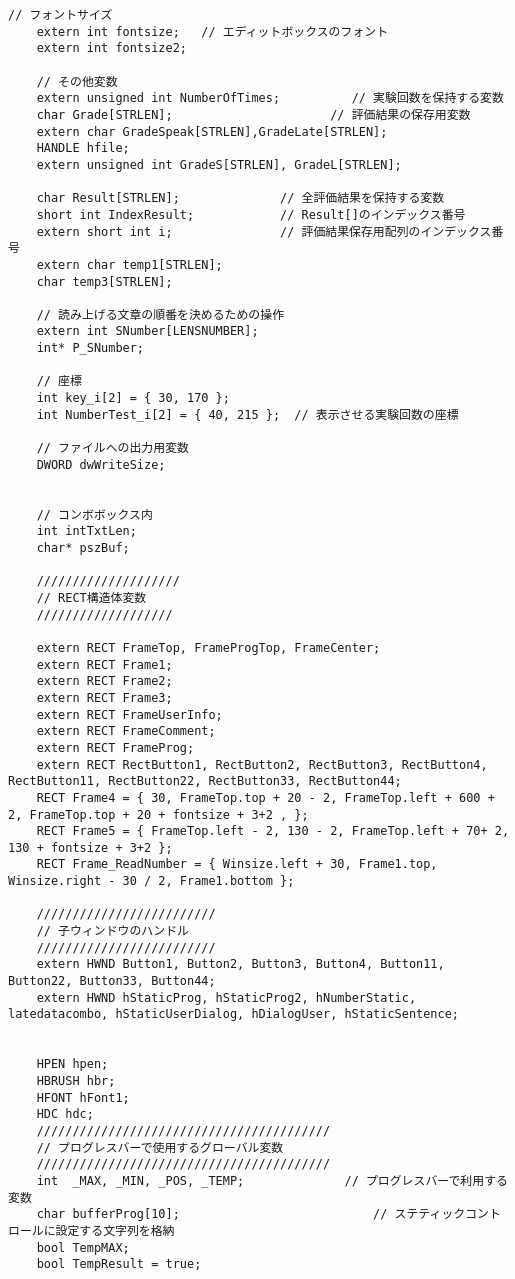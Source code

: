 \begin{lstlisting}[caption=main.cpp]
	// フォントサイズ
	extern int fontsize;   // エディットボックスのフォント
	extern int fontsize2;
	
	// その他変数
	extern unsigned int NumberOfTimes;          // 実験回数を保持する変数
	char Grade[STRLEN];                      // 評価結果の保存用変数
	extern char GradeSpeak[STRLEN],GradeLate[STRLEN];
	HANDLE hfile;
	extern unsigned int GradeS[STRLEN], GradeL[STRLEN];
	
	char Result[STRLEN];              // 全評価結果を保持する変数
	short int IndexResult;            // Result[]のインデックス番号 
	extern short int i;               // 評価結果保存用配列のインデックス番号
	extern char temp1[STRLEN];
	char temp3[STRLEN];
	
	// 読み上げる文章の順番を決めるための操作
	extern int SNumber[LENSNUMBER];
	int* P_SNumber;
	
	// 座標
	int key_i[2] = { 30, 170 };         
	int NumberTest_i[2] = { 40, 215 };  // 表示させる実験回数の座標
	
	// ファイルへの出力用変数
	DWORD dwWriteSize;
	
	
	// コンボボックス内
	int intTxtLen;
	char* pszBuf;
	
	////////////////////
	// RECT構造体変数
	///////////////////
	 
	extern RECT FrameTop, FrameProgTop, FrameCenter;
	extern RECT Frame1;
	extern RECT Frame2;
	extern RECT Frame3;
	extern RECT FrameUserInfo;
	extern RECT FrameComment;
	extern RECT FrameProg;
	extern RECT RectButton1, RectButton2, RectButton3, RectButton4, RectButton11, RectButton22, RectButton33, RectButton44;
	RECT Frame4 = { 30, FrameTop.top + 20 - 2, FrameTop.left + 600 + 2, FrameTop.top + 20 + fontsize + 3+2 , };
	RECT Frame5 = { FrameTop.left - 2, 130 - 2, FrameTop.left + 70+ 2, 130 + fontsize + 3+2 };
	RECT Frame_ReadNumber = { Winsize.left + 30, Frame1.top, Winsize.right - 30 / 2, Frame1.bottom };
	
	/////////////////////////
	// 子ウィンドウのハンドル
	/////////////////////////
	extern HWND Button1, Button2, Button3, Button4, Button11, Button22, Button33, Button44;
	extern HWND hStaticProg, hStaticProg2, hNumberStatic, latedatacombo, hStaticUserDialog, hDialogUser, hStaticSentence;
	
	
	HPEN hpen;
	HBRUSH hbr;
	HFONT hFont1;
	HDC hdc;
	/////////////////////////////////////////
	// プログレスバーで使用するグローバル変数
	/////////////////////////////////////////
	int  _MAX, _MIN, _POS, _TEMP;              // プログレスバーで利用する変数
	char bufferProg[10];                           // ステティックコントロールに設定する文字列を格納
	bool TempMAX;
	bool TempResult = true;
	

\end{lstlisting}
